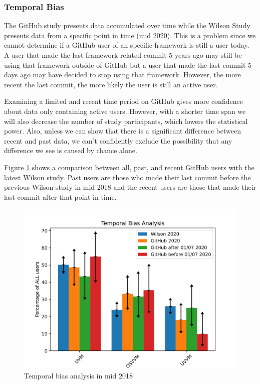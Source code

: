 \documentclass[]{article}
\begin{document}
\hypertarget{temporal-bias}{%
\subsubsection{Temporal Bias}\label{temporal-bias}}

The GitHub study presents data accumulated over time while the Wilson Study presents data from a specific point in time (mid 2020). This is a problem since we cannot determine if a GitHub user of an specific framework is still a user today. A user that made the last framework-related commit 5 years ago may still be using that framework outside of GitHub but a user that made the last commit 5 days ago may have decided to stop using that framework. However, the more recent the last commit, the more likely the user is still an active user.

Examining a limited and recent time period on GitHub gives more confidence about data only containing active users. However, with a shorter time span we will also decrease the number of study participants, which lowers the statistical power. Also, unless we can show that there is a significant difference between recent and past data, we can't confidently exclude the possibility that any difference we see is caused by chance alone.

Figure \ref{fig:temporal-bias-analysis-mid-2018} shows a comparison between all, past, and recent GitHub users with the latest Wilson study. Past users are those who made their last commit before the previous Wilson study in mid 2018 and the recent users are those that made their last commit after that point in time.

\begin{figure}

{\centering \includegraphics[width=1\linewidth]{img/temporal_bias_analysis_mid_2018} 

}

\caption{Temporal bias analysis in mid 2018}\label{fig:temporal-bias-analysis-mid-2018}
\end{figure}
\end{document}
